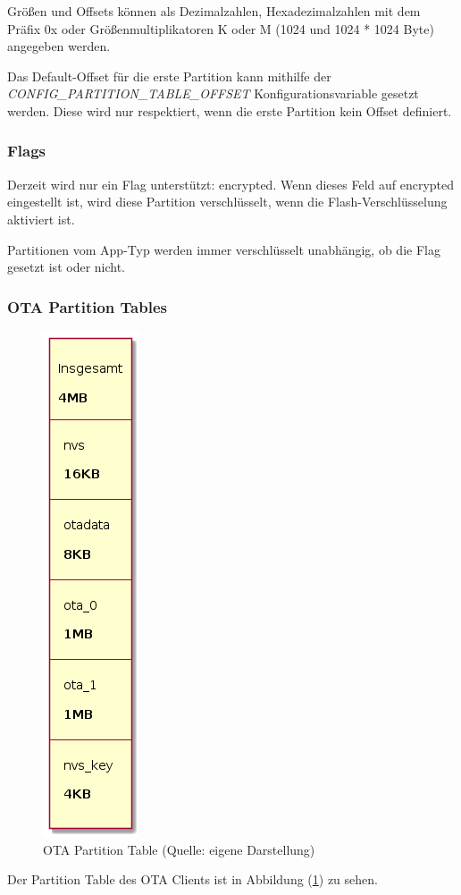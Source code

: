 Größen und Offsets können als Dezimalzahlen, Hexadezimalzahlen mit dem Präfix 0x oder Größenmultiplikatoren K oder M (1024 und 1024 * 1024 Byte) angegeben werden.

Das Default-Offset für die erste Partition kann mithilfe der \textit{CONFIG\_PARTITION\_TABLE\_OFFSET} Konfigurationsvariable gesetzt werden. Diese wird nur respektiert, wenn die erste Partition kein Offset definiert.

\subsubsection{Flags}
Derzeit wird nur ein Flag unterstützt: encrypted. Wenn dieses Feld auf encrypted eingestellt ist, wird diese Partition verschlüsselt, wenn die Flash-Verschlüsselung aktiviert ist.

Partitionen vom App-Typ werden immer verschlüsselt unabhängig, ob die Flag gesetzt ist oder nicht.\cite{espressif_partition_tables}

\subsubsection{OTA Partition Tables}
\begin{figure}[H]
    \begin{center}
        \includegraphics[scale=0.7]{diagrams/ota_partition_table.png}
        \caption{OTA Partition Table (Quelle: eigene Darstellung)}
        \label{abb:ota_partition_table}
    \end{center}    
\end{figure}
Der Partition Table des OTA Clients ist in Abbildung (\ref{abb:ota_partition_table}) zu sehen.

